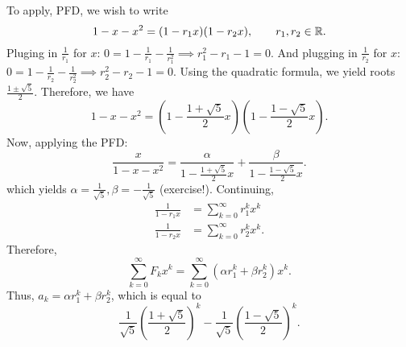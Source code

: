 To apply, PFD, we wish to write \[
	1-x-x^2=(1-r_{1}x)(1-r_{2}x), \qquad r_{1},r_{2} \in \mathbb{R}
.\] 
Pluging in \( \frac{1}{r_{1}} \) for \( x \): \( 0 = 1-\frac{1}{r_{1}} - \frac{1}{r_{1}^2} \implies r_1^2-r_{1}-1=0 \). And plugging in \( \frac{1}{r_{2}} \) for \( x \): \( 0 = 1 - \frac{1}{r_{2}} - \frac{1}{r_2^2} \implies r_2^2-r_{2}-1=0\). Using the quadratic formula, we yield roots \( \frac{1\pm \sqrt{5} }{2} \). Therefore, we have \[
	1-x-x^2 = \left(1-\frac{1+\sqrt{5} }{2}x\right)\left(1-\frac{1-\sqrt{5} }{2}x\right)
.\] Now, applying the PFD: \[
	\frac{x}{1-x-x^2} = \frac{\alpha}{1-\frac{1+\sqrt{5} }{2}x} + \frac{\beta}{1-\frac{1-\sqrt{5} }{2}x}
.\] which yields \( \alpha =\frac{1}{\sqrt{5} }, \beta =-\frac{1}{\sqrt{5} }\) (exercise!). Continuing, 
\begin{align*}
	\frac{1}{1-r_{1}x} &= \sum_{k=0}^{\infty} r_{1}^kx^k \\
	\frac{1}{1-r_{2}x} &= \sum_{k=0}^{\infty} r_{2}^kx^k
.\end{align*}
Therefore, \[
	\sum_{k=0}^{\infty} F_kx^k = \sum_{k=0}^{\infty} (\alpha r_{1}^k + \beta r_{2}^k)x^k
.\] Thus, \( a_k = \alpha r_{1}^k + \beta r_{2}^k \), which is equal to \[
	\frac{1}{\sqrt{5} }\left( \frac{1+\sqrt{5} }{2} \right)^k - \frac{1}{\sqrt{5} }\left( \frac{1-\sqrt{5} }{2} \right)^k
.\] 
